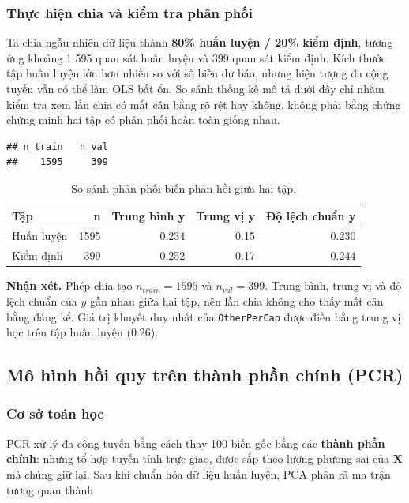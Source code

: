\subsubsection{Thực hiện chia và kiểm tra phân
phối}\label{thux1ef1c-hiux1ec7n-chia-vuxe0-kiux1ec3m-tra-phuxe2n-phux1ed1i}

Ta chia ngẫu nhiên dữ liệu thành \textbf{80\% huấn luyện / 20\% kiểm
định}, tương ứng khoảng 1 595 quan sát huấn luyện và 399 quan sát kiểm
định. Kích thước tập huấn luyện lớn hơn nhiều so với số biến dự báo,
nhưng hiện tượng đa cộng tuyến vẫn có thể làm OLS bất ổn. So sánh thống
kê mô tả dưới đây chỉ nhằm kiểm tra xem lần chia có mất cân bằng rõ rệt
hay không, không phải bằng chứng chứng minh hai tập có phân phối hoàn
toàn giống nhau.

\begin{verbatim}
## n_train   n_val 
##    1595     399
\end{verbatim}

\begin{longtable}[t]{lrrrr}
\caption{\label{tab:kiem-tra-can-bang}So sánh phân phối biến phản hồi giữa hai tập.}\\
\toprule
Tập & n & Trung bình y & Trung vị y & Độ lệch chuẩn y\\
\midrule
Huấn luyện & 1595 & 0.234 & 0.15 & 0.230\\
Kiểm định & 399 & 0.252 & 0.17 & 0.244\\
\bottomrule
\end{longtable}

\textbf{Nhận xét.} Phép chia tạo \(n_{train} = 1595\) và
\(n_{val} = 399\). Trung bình, trung vị và độ lệch chuẩn của \(y\) gần
nhau giữa hai tập, nên lần chia không cho thấy mất cân bằng đáng kể. Giá
trị khuyết duy nhất của \texttt{OtherPerCap} được điền bằng trung vị học
trên tập huấn luyện (\(0.26\)).

\subsection{Mô hình hồi quy trên thành phần chính
(PCR)}\label{muxf4-huxecnh-hux1ed3i-quy-truxean-thuxe0nh-phux1ea7n-chuxednh-pcr}

\subsubsection{Cơ sở toán học}\label{cux1a1-sux1edf-touxe1n-hux1ecdc}

PCR xử lý đa cộng tuyến bằng cách thay 100 biến gốc bằng các
\textbf{thành phần chính}: những tổ hợp tuyến tính trực giao, được sắp
theo lượng phương sai của \(\mathbf X\) mà chúng giữ lại. Sau khi chuẩn
hóa dữ liệu huấn luyện, PCA phân rã ma trận tương quan thành

